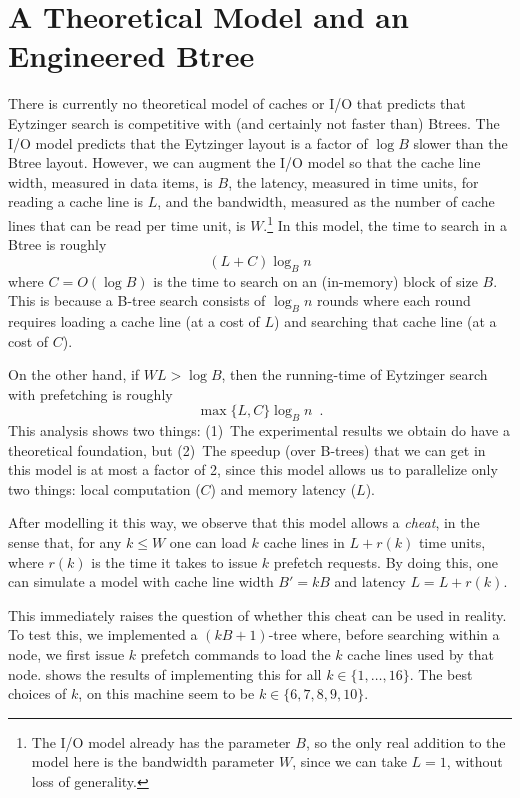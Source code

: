 \documentclass{patmorin}
\begin{document}
\section{A Theoretical Model and an Engineered Btree}

There is currently no theoretical model of caches or I/O that predicts
that Eytzinger search is competitive with (and certainly not faster than)
Btrees.  The I/O model \cite{aggarwal.vitter:input} predicts that the
Eytzinger layout is a factor of $\log B$ slower than the Btree layout.
However, we can augment the I/O model so that the cache line width,
measured in data items, is $B$, the latency, measured in time units, for
reading a cache line is $L$, and the bandwidth, measured as the number
of cache lines that can be read per time unit, is $W$.\footnote{The I/O
model already has the parameter $B$, so the only real addition to the
model here is the bandwidth parameter $W$, since we can take $L=1$,
without loss of generality.}  In this model, the time to search in a
Btree is roughly
\[
     (L+C)\log_B n
\]
where $C=O(\log B)$ is the time to search on an (in-memory) block
of size $B$.  This is because a B-tree search consists of $\log_B n$
rounds where each round requires loading a cache line (at a cost of $L$)
and searching that cache line (at a cost of $C$).

On the other hand, if $WL > \log B$, then the running-time of Eytzinger
search with prefetching is roughly
\[
    \max\{L,C\}\log_B n \enspace .
\]
This analysis shows two things: (1)~The experimental results we obtain do
have a theoretical foundation, but (2)~The speedup (over B-trees) that we
can get in this model is at most a factor of 2, since this model allows us
to parallelize only two things: local computation ($C$) and memory latency
($L$).

After modelling it this way, we observe that this model allows a
\emph{cheat}, in the sense that, for any $k\le W$ one can load $k$
cache lines in $L+r(k)$ time units, where $r(k)$ is the time it takes
to issue $k$ prefetch requests.  By doing this, one can simulate a model
with cache line width $B'=kB$ and latency $L=L+r(k)$.  

This immediately raises the question of whether this cheat can be used
in reality.  To test this, we implemented a $(kB+1)$-tree where, before
searching within a node, we first issue $k$ prefetch commands to load the
$k$ cache lines used by that node.   shows the results of
implementing this for all $k\in\{1,\ldots,16\}$. The best choices of $k$,
on this machine seem to be $k\in\{6,7,8,9,10\}$.
\end{document}
